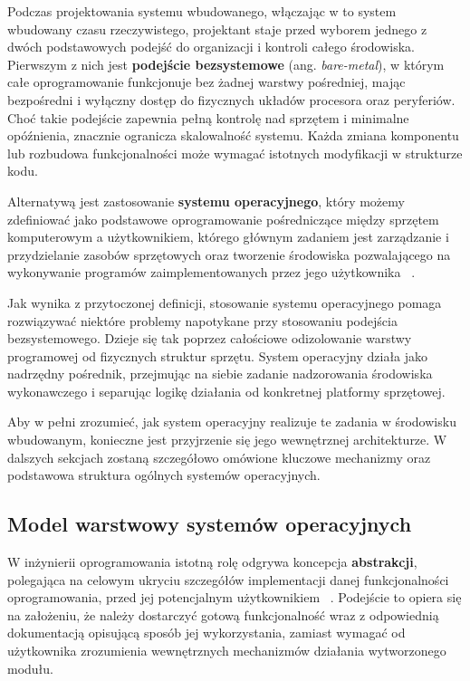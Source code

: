 Podczas projektowania systemu wbudowanego, włączając w to system wbudowany czasu rzeczywistego, projektant staje przed wyborem jednego z dwóch podstawowych podejść do organizacji i kontroli całego środowiska. 
Pierwszym z nich jest \textbf{podejście bezsystemowe}  (ang. \textit{bare-metal}), w którym całe oprogramowanie funkcjonuje bez żadnej warstwy pośredniej, 
mając bezpośredni i wyłączny dostęp do fizycznych układów procesora oraz peryferiów. 
Choć takie podejście zapewnia pełną kontrolę nad sprzętem i minimalne opóźnienia, znacznie ogranicza skalowalność systemu. Każda zmiana komponentu lub rozbudowa funkcjonalności może wymagać istotnych modyfikacji w strukturze kodu.

Alternatywą jest zastosowanie \textbf{systemu operacyjnego}, który możemy zdefiniować jako podstawowe oprogramowanie pośredniczące między sprzętem komputerowym a użytkownikiem, 
którego głównym zadaniem jest zarządzanie i przydzielanie zasobów sprzętowych oraz tworzenie środowiska pozwalającego na wykonywanie programów zaimplementowanych przez jego użytkownika ~\cite{Abraham_Silberschatz}.

Jak wynika z przytoczonej definicji, stosowanie systemu operacyjnego pomaga rozwiązywać niektóre problemy napotykane przy stosowaniu podejścia bezsystemowego. 
Dzieje się tak poprzez całościowe odizolowanie warstwy programowej od fizycznych struktur sprzętu.
System operacyjny działa jako nadrzędny pośrednik, przejmując na siebie zadanie nadzorowania środowiska wykonawczego i separując logikę działania
od konkretnej platformy sprzętowej. 

Aby w pełni zrozumieć, jak system operacyjny realizuje te zadania w środowisku wbudowanym, konieczne jest przyjrzenie się jego wewnętrznej architekturze.
 W dalszych sekcjach zostaną szczegółowo omówione kluczowe mechanizmy oraz podstawowa struktura ogólnych systemów operacyjnych.

\subsection{Model warstwowy systemów operacyjnych}


W inżynierii oprogramowania istotną rolę odgrywa koncepcja \textbf{abstrakcji}, polegająca na  celowym ukryciu szczegółów implementacji danej funkcjonalności oprogramowania, przed jej potencjalnym użytkownikiem ~\cite{Tanenbaum}.
Podejście to opiera się na założeniu, że należy dostarczyć gotową funkcjonalność  wraz z odpowiednią dokumentacją opisującą sposób jej wykorzystania, zamiast wymagać od użytkownika zrozumienia wewnętrznych mechanizmów działania wytworzonego modułu.

